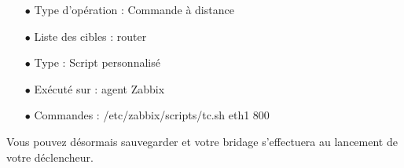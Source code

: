		\vspace{0.5cm}

		\begin{itemize}
			\item[$\bullet$] Type d'opération : Commande à distance

			\item[$\bullet$] Liste des cibles : router

			\item[$\bullet$] Type : Script personnalisé

			\item[$\bullet$] Exécuté sur : agent Zabbix

			\item[$\bullet$] Commandes : /etc/zabbix/scripts/tc.sh eth1 800\\
		\end{itemize}
	
		Vous pouvez désormais sauvegarder et votre bridage s'effectuera au lancement de votre déclencheur.\\
			
\newpage
